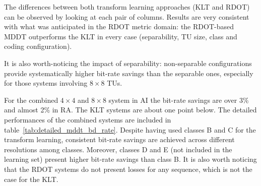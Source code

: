 \documentclass[11pt,a4paper,openright,twoside]{book}
\numberwithin{equation}{section} %
\numberwithin{figure}{section} %
\numberwithin{table}{section} %
\begin{document}
The differences between both transform learning approaches (\ac{KLT} and
\ac{RDOT}) can be observed by looking at each pair of columns.
Results are very consistent with what was anticipated in the \ac{RDOT} metric
domain:
the \ac{RDOT}-based \ac{MDDT} outperforms the \ac{KLT} in every case
(separability, \ac{TU} size, class and coding configuration).

It is also worth-noticing the impact of separability:
non-separable configurations provide systematically higher bit-rate savings
than the separable ones, especially for those systems involving $8\times8$
\acp{TU}.

For the combined $4\times4$ and $8\times8$ system in \ac{AI} the bit-rate
savings are over 3\% and almost 2\% in \ac{RA}.
The \ac{KLT} systems are about one point below.
The detailed performances of the combined systems are included in
table~\ref{tab:detailed_mddt_bd_rate}.
Despite having used classes B and C for the transform learning, consistent
bit-rate savings are achieved across different resolutions among classes.
Moreover, classes D and E (not included in the learning set) present higher
bit-rate savings than class B.
It is also worth noticing that the \ac{RDOT} systems do not present losses for
any sequence, which is not the case for the \ac{KLT}.
\end{document}
